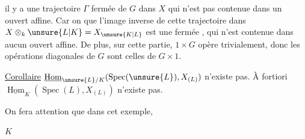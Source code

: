il y a  une trajectoire $\Gamma$ fermée de $G$ dans $X$ qui n'est pas contenue dans un ouvert affine. Car on \uline{} que l'image inverse de cette trajectoire dans $X\otimes_k\unsure{L|K}=X_{\unsure{K|L}}$ est  une   fermée , qui n'est contenue dans aucun ouvert affine.  De plus, sur cette partie, $1\times G$ opère trivialement, donc les opérations  diagonales de $G$ sont celles de $G\times1$.


\uline{Corollaire} $\underline{\operatorname{Hom}}_{\unsure{L}/K}(\operatorname{Spec}(\unsure{L}),X_{(L)})$ n'existe pas. À fortiori $\underline{\operatorname{Hom}}_K(\operatorname{Spec}(L),X_{(L)})$ n'existe pas.

On fera attention que dans cet exemple,

$K$
